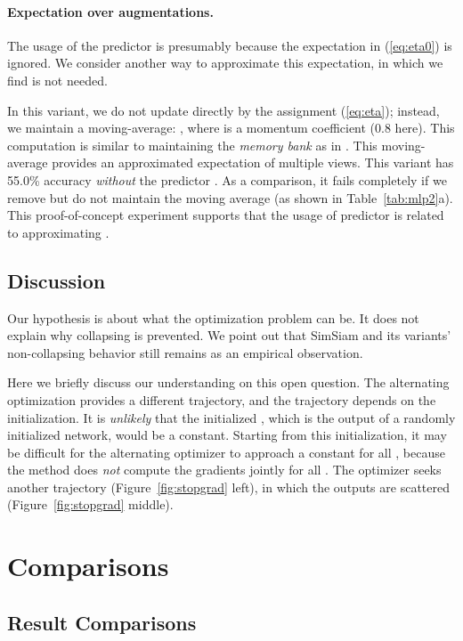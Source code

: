 \documentclass[final]{cvpr}
\begin{document}
\paragraph{Expectation over augmentations.} The usage of the predictor  is presumably because the expectation  in (\ref{eq:eta0}) is ignored. We consider another way to approximate this expectation, in which we find  is not needed.

In this variant, we do not update  directly by the assignment (\ref{eq:eta}); instead, we maintain a moving-average: , where  is a momentum coefficient (0.8 here). This computation is similar to maintaining the \emph{memory bank} as in \cite{Wu2018a}.
This moving-average provides an approximated expectation of multiple views.
This variant has 55.0\% accuracy \emph{without} the predictor . As a comparison, it fails completely if we remove  but do not maintain the moving average (as shown in Table~\ref{tab:mlp2}a). This proof-of-concept experiment supports that the usage of predictor  is related to approximating .

\subsection{Discussion}

Our hypothesis is about what the optimization problem can be. It does not explain why collapsing is prevented.
We point out that SimSiam and its variants' non-collapsing behavior still remains as an empirical observation.

Here we briefly discuss our understanding on this open question. 
The alternating optimization provides a different trajectory, and the trajectory depends on the initialization.
It is \emph{unlikely} that the initialized , which is the output of a randomly initialized network, would be a constant.
Starting from this initialization, it may be difficult for the alternating optimizer to approach a constant  for all , because the method does \emph{not} compute the gradients \wrt  jointly for all .
The optimizer seeks another trajectory (Figure~\ref{fig:stopgrad} left), in which the outputs are scattered (Figure~\ref{fig:stopgrad} middle).


\section{Comparisons} \label{sec:results}

\subsection{Result Comparisons} \label{sec:results}
\end{document}
